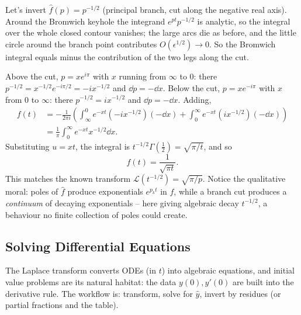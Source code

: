 \documentclass[a4paper]{scrartcl}
\begin{document}
\begin{example}
	Let's invert $\hat f(p) = p^{-1/2}$ (principal branch, cut along the negative real axis). Around the Bromwich keyhole the integrand $e^{pt} p^{-1/2}$ is analytic, so the integral over the whole closed contour vanishes; the large arcs die as before, and the little circle around the branch point contributes $O(\epsilon^{1/2}) \to 0$. So the Bromwich integral equals minus the contribution of the two legs along the cut.

	Above the cut, $p = xe^{i\pi}$ with $x$ running from $\infty$ to $0$: there $p^{-1/2} = x^{-1/2} e^{-i\pi/2} = -ix^{-1/2}$ and $\dd p = -\dd x$. Below the cut, $p = x e^{-i\pi}$ with $x$ from $0$ to $\infty$: there $p^{-1/2} = ix^{-1/2}$ and $\dd p = -\dd x$. Adding,
	\begin{align*}
	f(t) &= -\frac{1}{2\pi i}\left(\int_\infty^0 e^{-xt}(-ix^{-1/2})(-\dd x) + \int_0^\infty e^{-xt} (i x^{-1/2})(-\dd x) \right) \\
	&= \frac{1}{\pi} \int_0^\infty e^{-xt} x^{-1/2} \dd x.
	\end{align*}
	Substituting $u = xt$, the integral is $t^{-1/2} \Gamma(\frac 12) = \sqrt{\pi/t}$, and so
	$$
	f(t) = \frac{1}{\sqrt{\pi t}}.
	$$
	This matches the known transform $\mathcal L(t^{-1/2}) = \sqrt{\pi/p}$. Notice the qualitative moral: poles of $\hat f$ produce exponentials $e^{p_k t}$ in $f$, while a branch cut produces a \emph{continuum} of decaying exponentials -- here giving algebraic decay $t^{-1/2}$, a behaviour no finite collection of poles could create.
\end{example}

\subsection{Solving Differential Equations}

The Laplace transform converts ODEs (in $t$) into algebraic equations, and initial value problems are its natural habitat: the data $y(0), y'(0)$ are built into the derivative rule. The workflow is: transform, solve for $\hat y$, invert by residues (or partial fractions and the table).
\end{document}
